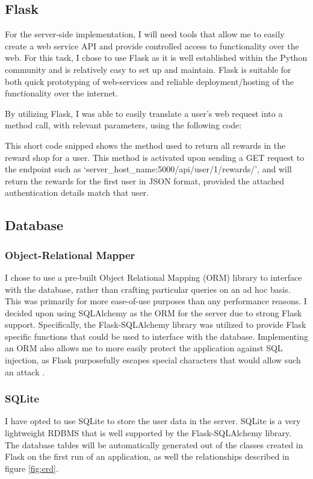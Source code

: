 \subsection{Flask}
For the server-side implementation, I will need tools that allow me to easily create a web service API and provide controlled access to functionality over the web.
For this task, I chose to use Flask as it is well established within the Python community and is relatively easy to set up and maintain. 
Flask is suitable for both quick prototyping of web-services and reliable deployment/hosting of the functionality over the internet.

By utilizing Flask, I was able to easily translate a user's web request into a method call, with relevant parameters, using the following code:

This short code snipped shows the method used to return all rewards in the reward shop for a user.
This method is activated upon sending a GET request to the endpoint such as `server\_host\_name:5000/api/user/1/rewards/', and will return the rewards for the first user in JSON format, provided the attached authentication details match that user. 

\subsection{Database}
\subsubsection{Object-Relational Mapper}
I chose to use a pre-built Object Relational Mapping (ORM) library to interface with the database, rather than crafting particular queries on an ad hoc basis. 
This was primarily for more ease-of-use purposes than any performance reasons. 
I decided upon using SQLAlchemy as the ORM for the server due to strong Flask support.
Specifically, the Flask-SQLAlchemy library was utilized to provide Flask specific functions that could be used to interface with the database.
Implementing an ORM also allows me to more easily protect the application against SQL injection, as Flask purposefully escapes special characters that would allow such an attack \citep[p.15]{copeland2008essential}.

\subsubsection{SQLite}
I have opted to use SQLite to store the user data in the server.
SQLite is a very lightweight RDBMS that is well supported by the Flask-SQLAlchemy library.
The database tables will be automatically generated out of the classes created in Flask on the first run of an application, as well the relationships described in figure \ref{fig:erd}. 

